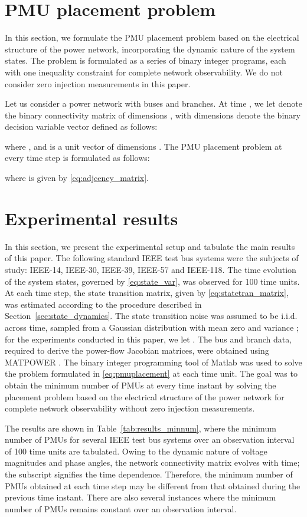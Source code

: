 \documentclass[10pt,journal,twocolumn]{IEEEtran}\IEEEoverridecommandlockouts
\newcommand{\iid}{i.i.d.}
\newcommand{\secref}[1]{Section~\ref{#1}}
\newcommand{\tabref}[1]{Table~\ref{#1}}
\begin{document}
\section{PMU placement problem}\label{sec:pmu_placement}
In this section, we formulate the PMU placement problem based on the electrical structure of the power network, incorporating the dynamic nature of the system states. The problem is formulated as a series of binary integer programs, each with one inequality constraint for complete network observability. We do not consider zero injection measurements in this paper.

Let us consider a power network with  buses and  branches. At time , we let  denote the binary connectivity matrix of dimensions ,  with dimensions  denote the binary decision variable vector defined as follows:

where , and  is a unit vector of dimensions . The PMU placement problem at every time step  is formulated as follows:

where  is given by \eqref{eq:adjcency_matrix}.

\section{Experimental results}\label{sec:results}
In this section, we present the experimental setup and tabulate the main results of this paper. The following standard IEEE test bus systems were the subjects of study: IEEE-14, IEEE-30, IEEE-39, IEEE-57 and IEEE-118. The time evolution of the system states, governed by \eqref{eq:state_var}, was observed for 100 time units. At each time step, the state transition matrix, given by \eqref{eq:statetran_matrix}, was estimated according to the procedure described in \secref{sec:state_dynamics}. The state transition noise  was assumed to be {\iid} across time, sampled from a Gaussian distribution with mean zero and variance ; for the experiments conducted in this paper, we let . The bus and branch data, required to derive the power-flow Jacobian matrices, were obtained using MATPOWER \cite{Zimmerman2011}. The binary integer programming tool of Matlab was used to solve the problem formulated in \eqref{eq:pmuplacement} at each time unit. The goal was to obtain the minimum number of PMUs at every time instant by solving the placement problem based on the electrical structure of the power network for complete network observability without zero injection measurements.

The results are shown in \tabref{tab:results_minnum}, where the minimum number of PMUs for several IEEE test bus systems over an observation interval of 100 time units are tabulated. Owing to the dynamic nature of voltage magnitudes and phase angles, the network connectivity matrix  evolves with time; the subscript  signifies the time dependence. Therefore, the minimum number of PMUs obtained at each time step may be different from that obtained during the previous time instant. There are also several instances where the minimum number of PMUs remains constant over an observation interval.
\end{document}
